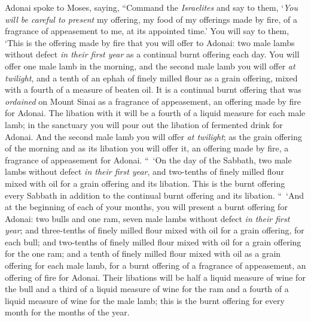 \begin{biblechapter} %
 Adonai spoke to Moses, saying,
\verse “Command the \textit{Israelites} and say to them, ‘\textit{You will be careful to present} my offering, my food of my offerings made by fire, of a fragrance of appeasement to me, at its appointed time.’
\verse You will say to them, ‘This is the offering made by fire that you will offer to Adonai: two male lambs without defect \textit{in their first year} as a continual burnt offering each day.
\verse You will offer one male lamb in the morning, and the second male lamb you will offer \textit{at twilight},
\verse and a tenth of an ephah of finely milled flour as a grain offering, mixed with a fourth of a measure of beaten oil.
\verse It is a continual burnt offering that was \textit{ordained} on Mount Sinai as a fragrance of appeasement, an offering made by fire for Adonai.
\verse The libation with it will be a fourth of a liquid measure for each male lamb; in the sanctuary you will pour out the libation of fermented drink for Adonai.
\verse And the second male lamb you will offer \textit{at twilight}; as the grain offering of the morning and as its libation you will offer it, an offering made by fire, a fragrance of appeasement for Adonai.
\verse “ ‘On the day of the Sabbath, two male lambs without defect \textit{in their first year}, and two-tenths of finely milled flour mixed with oil for a grain offering and its libation.
\verse This is the burnt offering every Sabbath in addition to the continual burnt offering and its libation.
\verse “ ‘And at the beginning of each of your months, you will present a burnt offering for Adonai: two bulls and one ram, seven male lambs without defect \textit{in their first year};
\verse and three-tenths of finely milled flour mixed with oil for a grain offering, for each bull; and two-tenths of finely milled flour mixed with oil for a grain offering for the one ram;
\verse and a tenth of finely milled flour mixed with oil as a grain offering for each male lamb, for a burnt offering of a fragrance of appeasement, an offering of fire for Adonai.
\verse Their libations will be half a liquid measure of wine for the bull and a third of a liquid measure of wine for the ram and a fourth of a liquid measure of wine for the male lamb; this is the burnt offering for every month for the months of the year.

\end{biblechapter}
